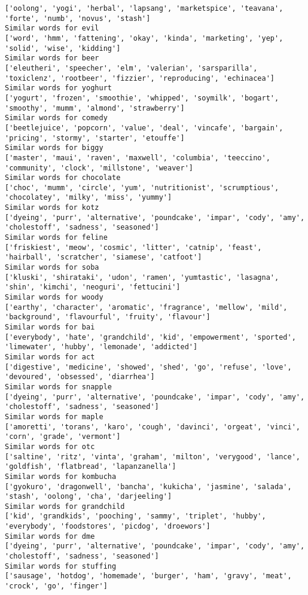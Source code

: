 \documentclass[11pt]{article}
\begin{document}
\begin{Verbatim}[commandchars=\\\{\}]
['oolong', 'yogi', 'herbal', 'lapsang', 'marketspice', 'teavana', 'forte', 'numb', 'novus', 'stash']
Similar words for evil
['word', 'hmm', 'fattening', 'okay', 'kinda', 'marketing', 'yep', 'solid', 'wise', 'kidding']
Similar words for beer
['eleutheri', 'speecher', 'elm', 'valerian', 'sarsparilla', 'toxiclenz', 'rootbeer', 'fizzier', 'reproducing', 'echinacea']
Similar words for yoghurt
['yogurt', 'frozen', 'smoothie', 'whipped', 'soymilk', 'bogart', 'smoothy', 'mumm', 'almond', 'strawberry']
Similar words for comedy
['beetlejuice', 'popcorn', 'value', 'deal', 'vincafe', 'bargain', 'pricing', 'stormy', 'starter', 'etouffe']
Similar words for biggy
['master', 'maui', 'raven', 'maxwell', 'columbia', 'teeccino', 'community', 'clock', 'millstone', 'weaver']
Similar words for chocolate
['choc', 'mumm', 'circle', 'yum', 'nutritionist', 'scrumptious', 'chocolatey', 'milky', 'miss', 'yummy']
Similar words for kotz
['dyeing', 'purr', 'alternative', 'poundcake', 'impar', 'cody', 'amy', 'cholestoff', 'sadness', 'seasoned']
Similar words for feline
['friskiest', 'meow', 'cosmic', 'litter', 'catnip', 'feast', 'hairball', 'scratcher', 'siamese', 'catfoot']
Similar words for soba
['kluski', 'shirataki', 'udon', 'ramen', 'yumtastic', 'lasagna', 'shin', 'kimchi', 'neoguri', 'fettucini']
Similar words for woody
['earthy', 'character', 'aromatic', 'fragrance', 'mellow', 'mild', 'background', 'flavourful', 'fruity', 'flavour']
Similar words for bai
['everybody', 'hate', 'grandchild', 'kid', 'empowerment', 'sported', 'limewater', 'hubby', 'lemonade', 'addicted']
Similar words for act
['digestive', 'medicine', 'showed', 'shed', 'go', 'refuse', 'love', 'devoured', 'obsessed', 'diarrhea']
Similar words for snapple
['dyeing', 'purr', 'alternative', 'poundcake', 'impar', 'cody', 'amy', 'cholestoff', 'sadness', 'seasoned']
Similar words for maple
['amoretti', 'torans', 'karo', 'cough', 'davinci', 'orgeat', 'vinci', 'corn', 'grade', 'vermont']
Similar words for otc
['saltine', 'ritz', 'vinta', 'graham', 'milton', 'verygood', 'lance', 'goldfish', 'flatbread', 'lapanzanella']
Similar words for kombucha
['gyokuro', 'dragonwell', 'bancha', 'kukicha', 'jasmine', 'salada', 'stash', 'oolong', 'cha', 'darjeeling']
Similar words for grandchild
['kid', 'grandkids', 'pooching', 'sammy', 'triplet', 'hubby', 'everybody', 'foodstores', 'picdog', 'droewors']
Similar words for dme
['dyeing', 'purr', 'alternative', 'poundcake', 'impar', 'cody', 'amy', 'cholestoff', 'sadness', 'seasoned']
Similar words for stuffing
['sausage', 'hotdog', 'homemade', 'burger', 'ham', 'gravy', 'meat', 'crock', 'go', 'finger']

\end{Verbatim}
\end{document}
